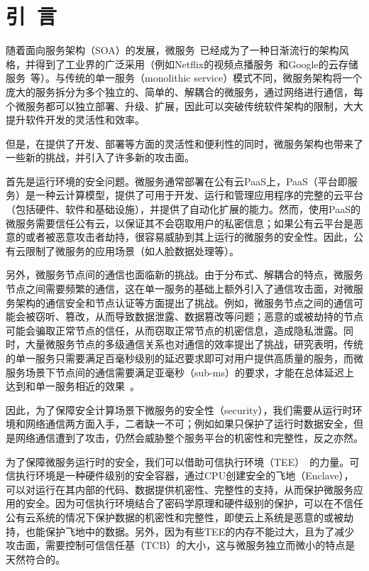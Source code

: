 \section{引\ 言}\label{sec:introduction}

随着面向服务架构（SOA）的发展，微服务~\cite{lewis2014microservices}已经成为了一种日渐流行的架构风格，并得到了工业界的广泛采用（例如Netflix的视频点播服务~\cite{msnetflix}和Google的云存储服务~\cite{msgoogle}等）。与传统的单一服务（monolithic service）模式不同，微服务架构将一个庞大的服务拆分为多个独立的、简单的、解耦合的微服务，通过网络进行通信，每个微服务都可以独立部署、升级、扩展，因此可以突破传统软件架构的限制，大大提升软件开发的灵活性和效率。


但是，在提供了开发、部署等方面的灵活性和便利性的同时，微服务架构也带来了一些新的挑战，并引入了许多新的攻击面。

首先是运行环境的安全问题。微服务通常部署在公有云PaaS上，PaaS（平台即服务）\cite{vaquero2008break}是一种云计算模型，提供了可用于开发、运行和管理应用程序的完整的云平台（包括硬件、软件和基础设施），并提供了自动化扩展的能力。然而，使用PaaS的微服务需要信任公有云，以保证其不会窃取用户的私密信息；如果公有云平台是恶意的或者被恶意攻击者劫持，很容易威胁到其上运行的微服务的安全性。因此，公有云限制了微服务的应用场景（如人脸数据处理等）。

另外，微服务节点间的通信也面临新的挑战。由于分布式、解耦合的特点，微服务节点之间需要频繁的通信，这在单一服务的基础上额外引入了通信攻击面，对微服务架构的通信安全和节点认证等方面提出了挑战。例如，微服务节点之间的通信可能会被窃听、篡改，从而导致数据泄露、数据篡改等问题；恶意的或被劫持的节点可能会骗取正常节点的信任，从而窃取正常节点的机密信息，造成隐私泄露。同时，大量微服务节点的多级通信关系也对通信的效率提出了挑战，研究表明，传统的单一服务只需要满足百毫秒级别的延迟要求即可对用户提供高质量的服务，而微服务场景下节点间的通信需要满足亚毫秒（sub-ms）的要求，才能在总体延迟上达到和单一服务相近的效果~\cite{sriraman2018mutune}。

因此，为了保障安全计算场景下微服务的安全性（security），我们需要从运行时环境和网络通信两方面入手，二者缺一不可；例如如果只保护了运行时数据安全，但是网络通信遭到了攻击，仍然会威胁整个服务平台的机密性和完整性，反之亦然。

为了保障微服务运行时的安全，我们可以借助可信执行环境（TEE）~\cite{sabt2015trusted}的力量。可信执行环境是一种硬件级别的安全容器，通过CPU创建安全的飞地（Enclave），可以对运行在其内部的代码、数据提供机密性、完整性的支持，从而保护微服务应用的安全。因为可信执行环境结合了密码学原理和硬件级别的保护，可以在不信任公有云系统的情况下保护数据的机密性和完整性，即使云上系统是恶意的或被劫持，也能保护飞地中的数据。另外，因为有些TEE的内存不能过大，且为了减少攻击面，需要控制可信信任基（TCB）的大小，这与微服务独立而微小的特点是天然符合的。

